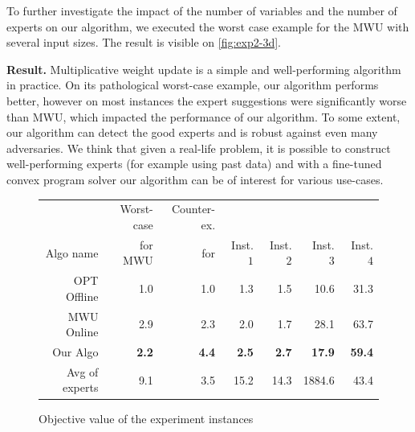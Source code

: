 To further investigate the impact of the number of variables and the number of experts on our algorithm, we executed the worst case example for the MWU with several input sizes. The result is visible on \cref{fig:exp2-3d}.

\textbf{Result.} Multiplicative weight update is a simple and well-performing algorithm in practice. On its pathological worst-case example, our algorithm performs better, however on most instances the expert suggestions were significantly worse than MWU, which impacted the performance of our algorithm. To some extent, our algorithm can detect the good experts and is robust against even many adversaries. We think that given a real-life problem, it is possible to construct well-performing experts (for example using past data) and with a fine-tuned convex program solver our algorithm can be of interest for various use-cases.

\begin{figure}[!ht]
\centering
\begin{tabular}{r|r|r|r|r|r|r}
          & Worst-case & Counter-ex. & & & & \\
Algo name & for MWU  & for \cite{AnandGe22:Online-Algorithms} & Inst. $1$ & Inst. $2$ & Inst. $3$ & Inst. $4$\\
\hline
OPT Offline            & 1.0 & 1.0 & 1.3 & 1.5 & 10.6 & 31.3 \\
MWU Online             & 2.9 & 2.3 & 2.0 & 1.7 & 28.1 & 63.7 \\
\hline
Our Algo           & {\bf 2.2} & {\bf 4.4} & {\bf 2.5} & {\bf 2.7} & {\bf 17.9}  & {\bf 59.4} \\
\hline
Avg of experts      & 9.1 & 3.5 & 15.2 & 14.3 & 1884.6 & 43.4 \\
\end{tabular}
\caption{Objective value of the experiment instances}
\label{fig:exp-objective}
\end{figure}

